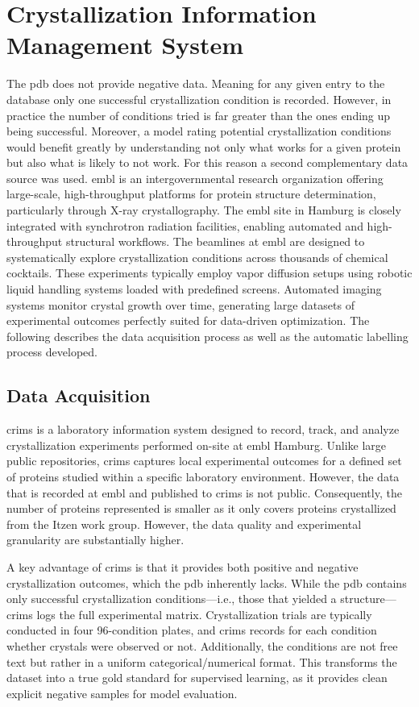 
\section{Crystallization Information Management System}\label{sec:crims}
The \gls{pdb} does not provide negative data. Meaning for any given entry to the database only one successful crystallization condition is recorded. However, in practice the number of conditions tried is far greater than the ones ending up being successful. Moreover, a model rating potential crystallization conditions would benefit greatly by understanding not only what works for a given protein but also what is likely to not work. For this reason a second complementary data source was used. \gls{embl} is an intergovernmental research organization offering large-scale, high-throughput platforms for protein structure determination, particularly through X-ray crystallography. The \gls{embl} site in Hamburg is closely integrated with synchrotron radiation facilities, enabling automated and high-throughput structural workflows. The beamlines at \gls{embl} are designed to systematically explore crystallization conditions across thousands of chemical cocktails. These experiments typically employ vapor diffusion setups using robotic liquid handling systems loaded with predefined screens. Automated imaging systems monitor crystal growth over time, generating large datasets of experimental outcomes perfectly suited for data-driven optimization. The following describes the data acquisition process as well as the automatic labelling process developed. 

\subsection{Data Acquisition}\label{sec:crims/data_acquisition}
\gls{crims} is a laboratory information system designed to record, track, and analyze crystallization experiments performed on-site at \gls{embl} Hamburg. Unlike large public repositories, \gls{crims} captures local experimental outcomes for a defined set of proteins studied within a specific laboratory environment. However, the data that is recorded at \gls{embl} and published to \gls{crims} is not public. Consequently, the number of proteins represented is smaller as it only covers proteins crystallized from the Itzen work group. However, the data quality and experimental granularity are substantially higher.

A key advantage of \gls{crims} is that it provides both positive and negative crystallization outcomes, which the \gls{pdb} inherently lacks. While the \gls{pdb} contains only successful crystallization conditions—i.e., those that yielded a structure—\gls{crims} logs the full experimental matrix. Crystallization trials are typically conducted in four 96-condition plates, and \gls{crims} records for each condition whether crystals were observed or not. Additionally, the conditions are not free text but rather in a uniform categorical/numerical format. This transforms the dataset into a true gold standard for supervised learning, as it provides clean explicit negative samples for model evaluation.

